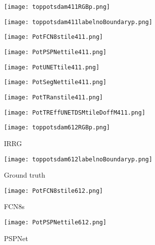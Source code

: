 \documentclass[journal]{IEEEtran}
\begin{document}
\begin{figure*}[hptb]
\begin{subfigure}{.11\textwidth}
   \texttt{[image: toppotsdam411RGBp.png]}
   \caption{}
\end{subfigure}
\hfill
\begin{subfigure}{.11\textwidth}
   \texttt{[image: toppotsdam411labelnoBoundaryp.png]}
   \caption{}
\end{subfigure}
\hfill
\begin{subfigure}{.11\textwidth}
   \texttt{[image: PotFCN8stile411.png]}
   \caption{}
\end{subfigure}
\hfill
\begin{subfigure}{.11\textwidth}
   \texttt{[image: PotPSPNettile411.png]}
   \caption{}
\end{subfigure}
\hfill
\begin{subfigure}{.11\textwidth}
   \texttt{[image: PotUNETtile411.png]}
   \caption{}
\end{subfigure}
\hfill
\begin{subfigure}{.11\textwidth}
   \texttt{[image: PotSegNettile411.png]}
   \caption{}
\end{subfigure}
\hfill
\begin{subfigure}{.11\textwidth}
   \texttt{[image: PotTRanstile411.png]}
   \caption{}
\end{subfigure}
\hfill
\begin{subfigure}{.11\textwidth}
   \texttt{[image: PotTREffUNETDSMtileDoffM411.png]}
   \caption{}
\end{subfigure}
\vfill
\begin{subfigure}{.11\textwidth}
   \texttt{[image: toppotsdam612RGBp.png]}
   \caption{IRRG}
\end{subfigure}
\hfill
\begin{subfigure}{.11\textwidth}
   \texttt{[image: toppotsdam612labelnoBoundaryp.png]}
   \caption{Ground truth}
\end{subfigure}
\hfill
\begin{subfigure}{.11\textwidth}
   \texttt{[image: PotFCN8stile612.png]}
   \caption{FCN8s}
\end{subfigure}
\hfill
\begin{subfigure}{.11\textwidth}
   \texttt{[image: PotPSPNettile612.png]}
   \caption{PSPNet}
\end{subfigure}

\end{figure*}
\end{document}
